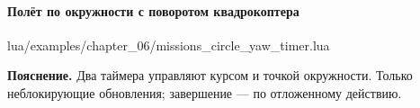 \paragraph{Полёт по окружности с поворотом квадрокоптера}
\begin{codefile}{lua/examples/chapter_06/missions_circle_yaw_timer.lua}
\end{codefile}
\textbf{Пояснение.} Два таймера управляют курсом и точкой окружности. Только неблокирующие обновления; завершение — по отложенному действию.
